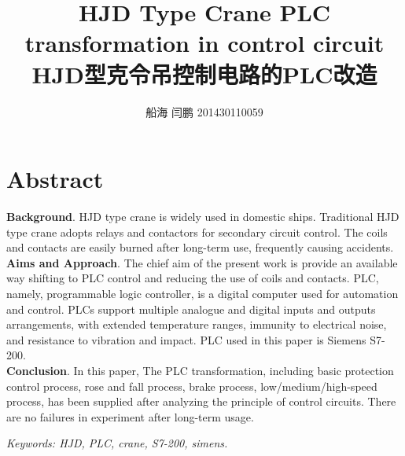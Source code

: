 \documentclass[a4paper]{article}
\renewcommand{\Large}{\fontsize{12pt}{\baselineskip}\selectfont}
\begin{document}
\title{ \Large HJD Type Crane PLC transformation in control circuit \\
 \Large HJD型克令吊控制电路的PLC改造}
\author{ 船海 闫鹏 201430110059}
\date{}
\maketitle
\thispagestyle{fancy}
\section*{ \Large Abstract}
\textbf{Background}. HJD type crane is widely used in domestic ships. Traditional HJD type crane adopts relays and contactors for secondary circuit control. The coils and contacts are easily burned after long-term use, frequently causing accidents. \\
\textbf{Aims and Approach}. The chief aim of the present work is provide an available way shifting to PLC control and reducing the use of coils and contacts. PLC, namely, programmable logic controller, is a digital computer used for automation and control. PLCs support multiple analogue and digital inputs and outputs arrangements, with extended temperature ranges, immunity to electrical noise, and resistance to vibration and impact. PLC used in this paper is Siemens S7-200.\\
\textbf{Conclusion}. In this paper, The PLC transformation, including basic protection control process, rose and fall process, brake process, low/medium/high-speed process, has been supplied after analyzing the principle of control circuits. There are no failures in experiment after long-term usage. 
\begin{flushright}
\textit{Keywords: HJD, PLC, crane, S7-200, simens.}
\end{flushright}
\end{document}
